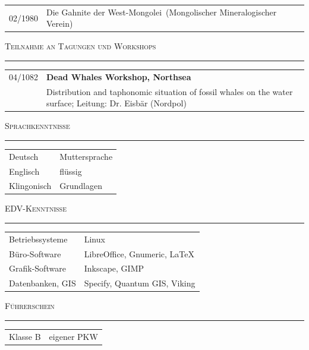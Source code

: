 \documentclass[a4paper,11pt]{scrartcl}
\begin{document}
\begin{tabularx}{\textwidth}{p{2.8cm}X}
	02/1980 & \glqq Die Gahnite der West-Mongolei\grqq\ (Mongolischer Mineralogischer Verein) \\

\end{tabularx}
\vspace*{0.5cm}

\newpage
\textsc{Teilnahme an Tagungen und Workshops}\par
\noindent\rule[1ex]{\textwidth}{0.2pt}

\begin{tabularx}{\textwidth}{p{2.8cm}X}
	04/1082 & \textbf{Dead Whales Workshop, Northsea} \\ 
		& Distribution and taphonomic situation of fossil whales on the water surface; Leitung: Dr. Eisbär (Nordpol)\\

\end{tabularx}
\vspace*{0.5cm}

\textsc{Sprachkenntnisse}\par
\noindent\rule[1ex]{\textwidth}{0.2pt}

\begin{tabularx}{\textwidth}{p{2.8cm}X}
	Deutsch & Muttersprache\\
	Englisch & flüssig\\
	Klingonisch & Grundlagen\\
\end{tabularx}
\vspace*{0.5cm}

\textsc{EDV-Kenntnisse}\par
\noindent\rule[1ex]{\textwidth}{0.2pt}

\begin{tabularx}{\textwidth}{p{2.8cm}X}
Betriebssysteme	& Linux\\
Büro-Software & LibreOffice, Gnumeric, \LaTeX\\
Grafik-Software & Inkscape, GIMP\\
Datenbanken, GIS & Specify, Quantum GIS, Viking\\
\end{tabularx}
\vspace*{0.5cm}

\textsc{Führerschein}\par
\noindent\rule[1ex]{\textwidth}{0.2pt}

\begin{tabularx}{\textwidth}{p{2.8cm}X}
Klasse B & eigener PKW
\end{tabularx}
\vspace*{0.5cm}
\end{document}
